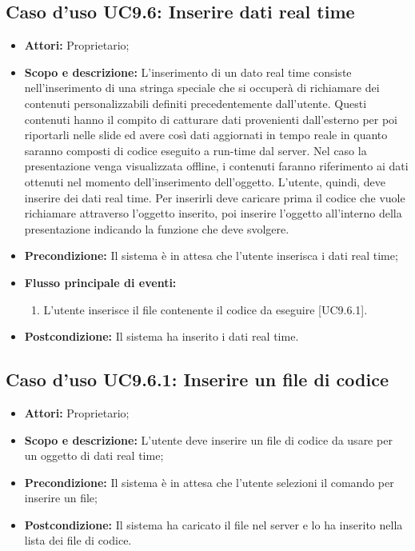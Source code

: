 \subsection{Caso d'uso UC9.6: Inserire dati real time}
\begin{itemize}
	\item \textbf{Attori:} Proprietario;
	\item \textbf{Scopo e descrizione:}	L'inserimento di un dato real time consiste nell'inserimento di una stringa speciale che si occuperà di richiamare dei contenuti personalizzabili definiti precedentemente dall'utente. Questi contenuti hanno il compito di catturare dati provenienti dall'esterno per poi riportarli nelle slide ed avere così dati aggiornati in tempo reale in quanto saranno composti di codice eseguito a run-time dal server. Nel caso la presentazione venga visualizzata offline, i contenuti faranno riferimento ai dati ottenuti nel momento dell'inserimento dell'oggetto.
	L'utente, quindi, deve inserire dei dati real time. Per inserirli deve caricare prima il codice che vuole richiamare attraverso l'oggetto inserito, poi inserire l'oggetto all'interno della presentazione indicando la funzione che deve svolgere.
	
	\item \textbf{Precondizione:} Il sistema è in attesa che l'utente inserisca i dati real time;
	\item \textbf{Flusso principale di eventi:}
	\begin{enumerate}
		\item L'utente inserisce il file contenente il codice da eseguire [UC9.6.1].
	\end{enumerate}
	\item \textbf{Postcondizione:} Il sistema ha inserito i dati real time.
\end{itemize}

	\subsection{Caso d'uso UC9.6.1: Inserire un file di codice}
	\begin{itemize}
		\item \textbf{Attori:} Proprietario;
		\item \textbf{Scopo e descrizione:} L'utente deve inserire un file di codice da usare per un oggetto di dati real time;
		\item \textbf{Precondizione:} Il sistema è in attesa che l'utente selezioni il comando per inserire un file;
		\item \textbf{Postcondizione:} Il sistema ha caricato il file nel server e lo ha inserito nella lista dei file di codice.
	\end{itemize}
	


